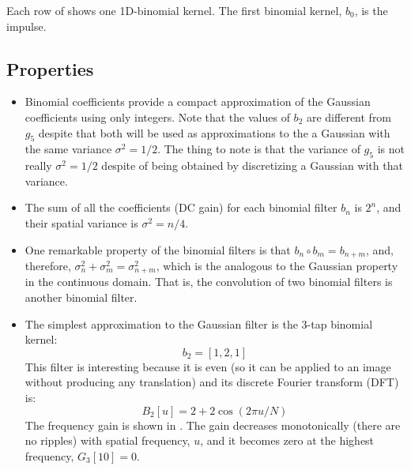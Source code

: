 Each row of \fig{\ref{fig:pascaltriangle}} shows one 1D-binomial kernel. The first binomial kernel, $b_0$, is the impulse.

\subsection{Properties}

\begin{itemize}
	\item Binomial coefficients provide a compact approximation of the Gaussian coefficients using only integers. Note that the values of $b_2$ are different from $g_5$ despite that both will be used as approximations to the a Gaussian with the same variance $\sigma^2 = 1/2$. The thing to note is that the variance of   $g_5$ is not really  $\sigma^2 = 1/2$ despite of being obtained by discretizing a Gaussian with that variance.


	\item The sum of all the coefficients (DC gain) for each binomial filter $b_n$ is $2^n$, and their spatial variance is $\sigma^2 = n/4$.

	\item One remarkable property of the binomial filters is that $b_n \circ b_m = b_{n+m}$, and, therefore, $\sigma_n^2 + \sigma_m^2  = \sigma_{n+m}^2$, which is the analogous to the Gaussian property in the continuous domain. That is, the convolution of two binomial filters is another binomial filter.


	\item The simplest approximation to the Gaussian filter is the 3-tap binomial kernel:
	      \begin{equation}
		      b_2 = \left[1, 2, 1\right]
	      \end{equation}
	      This filter is interesting because it is even (so it can be applied to an image without producing any translation) and its discrete Fourier transform (DFT) is:
	      \begin{equation}
		      B_2 \left[u\right] = 2+2 \cos (2 \pi u/N)
	      \end{equation}
	      The frequency gain is shown in . The gain decreases monotonically (there are no ripples) with spatial frequency, $u$, and it becomes zero at the highest frequency, $G_3 \left[ 10 \right]=0$.




\end{itemize}
